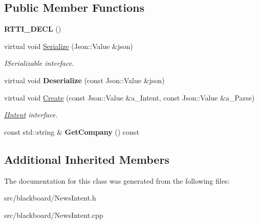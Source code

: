 \subsection*{Public Member Functions}
\begin{DoxyCompactItemize}
\item 
\mbox{\label{class_news_intent_ab07773d7e9a08928fed9c39cb95c8a4a}} 
{\bfseries R\+T\+T\+I\+\_\+\+D\+E\+CL} ()
\item 
\mbox{\label{class_news_intent_aa43e3a3cd1f73f23058a7779b0aa1415}} 
virtual void \hyperlink{class_news_intent_aa43e3a3cd1f73f23058a7779b0aa1415}{Serialize} (Json\+::\+Value \&json)
\begin{DoxyCompactList}\small\item\em I\+Serializable interface. \end{DoxyCompactList}\item 
\mbox{\label{class_news_intent_a543511149747ea8cf17d7da1f9c04338}} 
virtual void {\bfseries Deserialize} (const Json\+::\+Value \&json)
\item 
\mbox{\label{class_news_intent_adbf429d23597908ac4338ca518f4c498}} 
virtual void \hyperlink{class_news_intent_adbf429d23597908ac4338ca518f4c498}{Create} (const Json\+::\+Value \&a\+\_\+\+Intent, const Json\+::\+Value \&a\+\_\+\+Parse)
\begin{DoxyCompactList}\small\item\em \hyperlink{class_i_intent}{I\+Intent} interface. \end{DoxyCompactList}\item 
\mbox{\label{class_news_intent_af3e5f67756de75b5637950796ebb7582}} 
const std\+::string \& {\bfseries Get\+Company} () const
\end{DoxyCompactItemize}
\subsection*{Additional Inherited Members}


The documentation for this class was generated from the following files\+:\begin{DoxyCompactItemize}
\item 
src/blackboard/News\+Intent.\+h\item 
src/blackboard/News\+Intent.\+cpp\end{DoxyCompactItemize}
